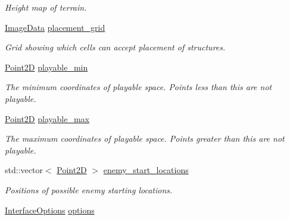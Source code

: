 \begin{DoxyCompactItemize}
\begin{DoxyCompactList}\small\item\em Height map of terrain. \end{DoxyCompactList}\item 
\mbox{\label{structsc2_1_1_game_info_a97b2e1a0e7b22105d52dd7761b16111f}} 
\hyperlink{structsc2_1_1_image_data}{Image\+Data} \hyperlink{structsc2_1_1_game_info_a97b2e1a0e7b22105d52dd7761b16111f}{placement\+\_\+grid}
\begin{DoxyCompactList}\small\item\em Grid showing which cells can accept placement of structures. \end{DoxyCompactList}\item 
\mbox{\label{structsc2_1_1_game_info_acf482bed6694db9ce4b7da0e139eac57}} 
\hyperlink{structsc2_1_1_point2_d}{Point2D} \hyperlink{structsc2_1_1_game_info_acf482bed6694db9ce4b7da0e139eac57}{playable\+\_\+min}
\begin{DoxyCompactList}\small\item\em The minimum coordinates of playable space. Points less than this are not playable. \end{DoxyCompactList}\item 
\mbox{\label{structsc2_1_1_game_info_a5b6d4abc12023b79a197ca3071ee79c8}} 
\hyperlink{structsc2_1_1_point2_d}{Point2D} \hyperlink{structsc2_1_1_game_info_a5b6d4abc12023b79a197ca3071ee79c8}{playable\+\_\+max}
\begin{DoxyCompactList}\small\item\em The maximum coordinates of playable space. Points greater than this are not playable. \end{DoxyCompactList}\item 
\mbox{\label{structsc2_1_1_game_info_a5b39c34817d8dd67e930d7628d9c32c1}} 
std\+::vector$<$ \hyperlink{structsc2_1_1_point2_d}{Point2D} $>$ \hyperlink{structsc2_1_1_game_info_a5b39c34817d8dd67e930d7628d9c32c1}{enemy\+\_\+start\+\_\+locations}
\begin{DoxyCompactList}\small\item\em Positions of possible enemy starting locations. \end{DoxyCompactList}\item 
\hyperlink{structsc2_1_1_interface_options}{Interface\+Options} \hyperlink{structsc2_1_1_game_info_a44cd71a765e383ef257e75ead9839d1c}{options}
\end{DoxyCompactItemize}


